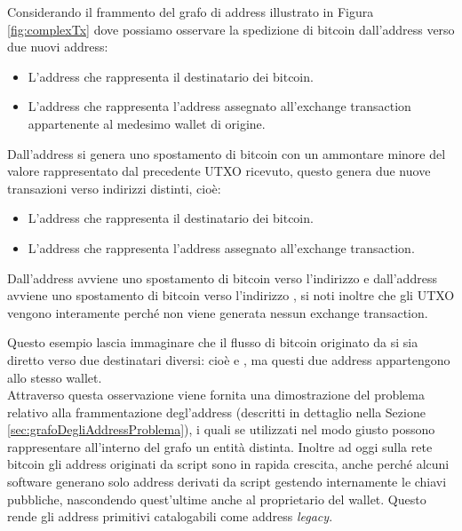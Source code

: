 \begin{example} \label{ex:complexTx}
  Considerando il frammento del grafo di address illustrato in Figura \ref{fig:complexTx} dove possiamo osservare la spedizione di bitcoin dall'address  verso due nuovi address:

  \begin{itemize}
    \item L'address  che rappresenta il destinatario dei bitcoin.
    \item L'address  che rappresenta l'address assegnato all'exchange transaction appartenente al medesimo wallet di origine.
  \end{itemize}
  Dall'address  si genera uno spostamento di bitcoin con un ammontare minore del valore rappresentato dal precedente UTXO ricevuto, questo genera due nuove transazioni verso indirizzi distinti, cioè:
  \begin{itemize}
    \item L'address  che rappresenta il destinatario dei bitcoin.
    \item L'address  che rappresenta l'address assegnato all'exchange transaction.
  \end{itemize}

  Dall'address  avviene uno spostamento di bitcoin verso l'indirizzo  e dall'address  avviene uno spostamento di bitcoin verso l'indirizzo , si noti inoltre che gli UTXO vengono  interamente perché non viene generata nessun exchange transaction.

  Questo esempio lascia immaginare che il flusso di bitcoin originato da  si sia diretto verso due destinatari diversi: cioè  e , ma questi due address appartengono allo stesso wallet.\\
  Attraverso questa osservazione viene fornita una dimostrazione del problema relativo alla frammentazione degl'address (descritti in dettaglio nella Sezione \ref{sec:grafoDegliAddressProblema}), i quali se utilizzati nel modo giusto possono rappresentare all'interno del grafo un entità distinta.
  Inoltre ad oggi sulla rete bitcoin gli address originati da script sono in rapida crescita, anche perché alcuni software generano solo address derivati da script gestendo internamente le chiavi pubbliche, nascondendo quest'ultime anche al proprietario del wallet.
  Questo rende gli address primitivi catalogabili come address \emph{legacy}.
\end{example}
